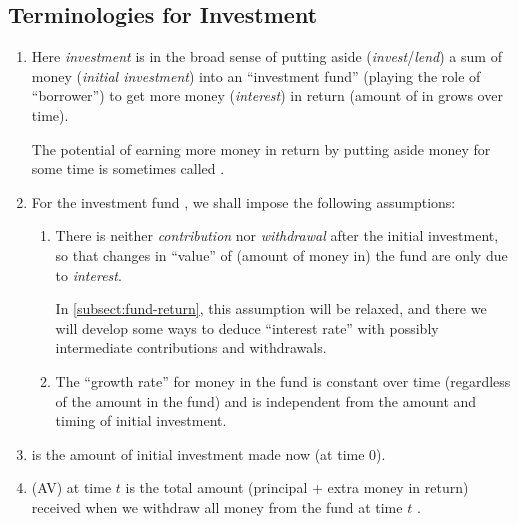 \subsection{Terminologies for Investment}
\begin{enumerate}
\item Here \emph{investment} is in the broad sense of putting aside
(\emph{invest}/\emph{lend}) a sum of money  (\emph{initial
investment}) into an ``investment fund''  (playing the role
of ``borrower'') to get more money  (\emph{interest}) in
return (amount of  in  grows over time).

\begin{note}
The potential of earning more money in return by putting aside money for some
time is sometimes called .
\end{note}

\item For the investment fund , we shall impose the following assumptions:
\begin{enumerate}
\item There is neither \emph{contribution} nor \emph{withdrawal} after the
initial investment, so that changes in ``value'' of (amount of money in) the
fund  are only due to \emph{interest}. \begin{note}
In \cref{subsect:fund-return}, this assumption will be relaxed, and there
we will develop some ways to deduce ``interest rate'' with possibly
intermediate contributions and withdrawals.
\end{note}
\item \label{it:growth-independent-amt-time}
The ``growth rate'' for money in the fund  is constant
over time (regardless of the amount in the fund) and is independent from the
amount and timing of initial investment.
\end{enumerate}

\item {} is the amount of initial investment made now (at time 0).
\item {} (AV) at time \(t\) is the total amount
(principal + extra money in return) received when we withdraw all money from
the fund  at time \(t\) .



\end{enumerate}
